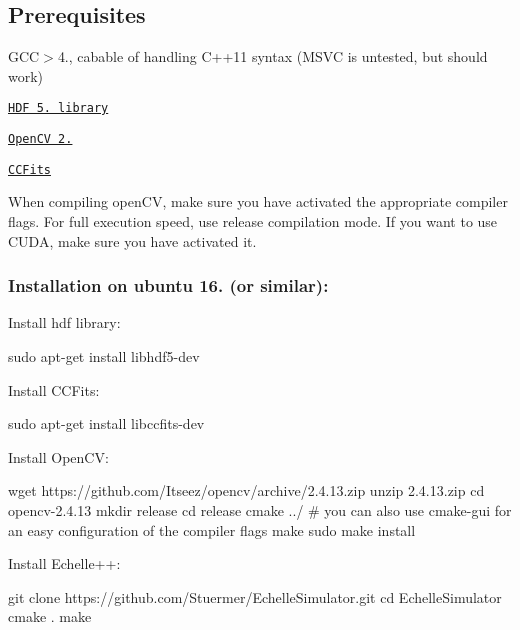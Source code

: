 \subsection*{Prerequisites}


\begin{DoxyItemize}
\item G\+CC$>$4., cabable of handling C++11 syntax (M\+S\+VC is untested, but should work)
\item \href{https://www.hdfgroup.org/hdf5/}{\tt H\+DF 5. library}
\item \href{http://opencv.org/}{\tt Open\+CV 2.}
\item \href{http://heasarc.gsfc.nasa.gov/fitsio/ccfits/}{\tt C\+C\+Fits}
\end{DoxyItemize}

When compiling open\+CV, make sure you have activated the appropriate compiler flags. For full execution speed, use release compilation mode. If you want to use C\+U\+DA, make sure you have activated it. \subsubsection*{Installation on ubuntu 16. (or similar)\+:}

Install hdf library\+: \begin{DoxyVerb}sudo apt-get install libhdf5-dev
\end{DoxyVerb}


Install C\+C\+Fits\+: \begin{DoxyVerb}sudo apt-get install libccfits-dev
\end{DoxyVerb}


Install Open\+CV\+: \begin{DoxyVerb}wget https://github.com/Itseez/opencv/archive/2.4.13.zip
unzip 2.4.13.zip
cd opencv-2.4.13
mkdir release
cd release
cmake ../
# you can also use cmake-gui for an easy configuration of the compiler flags
make
sudo make install
\end{DoxyVerb}


Install Echelle++\+: \begin{DoxyVerb}git clone https://github.com/Stuermer/EchelleSimulator.git
cd EchelleSimulator
cmake .
make
\end{DoxyVerb}
 \subsection*{}